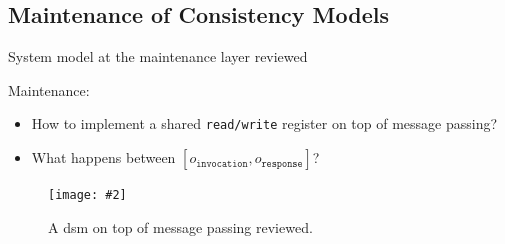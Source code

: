 \documentclass{beamer}
\newcommand{\fignocaption}[2]
{
  \begin{figure}[htp]
    \centering
      \texttt{[image: \#2]}
  \end{figure}
}
\newcommand{\fig}[3]
{
  \begin{figure}[htp]
    \centering
      \texttt{[image: \#2]}
      \caption[labelInTOC]{#3}
  \end{figure}
}
\newcommand{\largeblue}[1]{\textcolor{blue}{\large #1}}
\newcommand{\setinmath}[1]{\{ #1 \}}
\begin{document}
\subsection{Maintenance of Consistency Models}
\begin{frame}{System model at the maintenance layer reviewed}

  \begin{block}{Maintenance:}
    \begin{itemize}
      \item How to implement a shared \texttt{read/write} register on top of
      message passing?
      \item What happens between $[o_{\texttt{invocation}},
      o_{\texttt{response}}]$?
    \end{itemize}
  \end{block}

  \fig{width = 0.55\textwidth}{fig/dsm-model.pdf}
  {A dsm on top of message passing reviewed.}
\end{frame}

\end{document}
